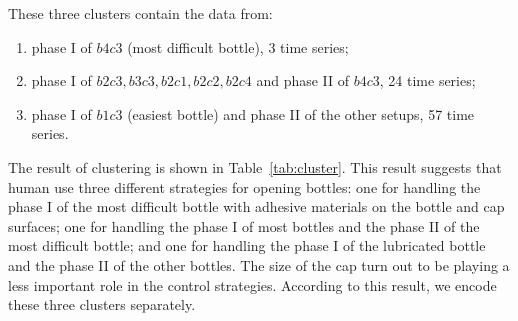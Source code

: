 These three clusters contain the data from:

\begin{enumerate}
\item phase I of $b4c3$ (most difficult bottle), 3 time series;
\item phase I of $b2c3, b3c3, b2c1, b2c2, b2c4$ and phase II of $b4c3$, 24 time series;
\item phase I of $b1c3$ (easiest bottle) and phase II of the other setups, 57 time series.
\end{enumerate}

The result of clustering is shown in Table~\ref{tab:cluster}. This result suggests that human use three different strategies for opening bottles: one for handling the phase I of the most difficult bottle with adhesive materials on the bottle and cap surfaces; one for handling the phase I of most bottles and the phase II of the most difficult bottle; and one for handling the phase I of the lubricated bottle and the phase II of the other bottles. The size of the cap turn out to be playing a less important role in the control strategies. According to this result, we encode these three clusters separately.




